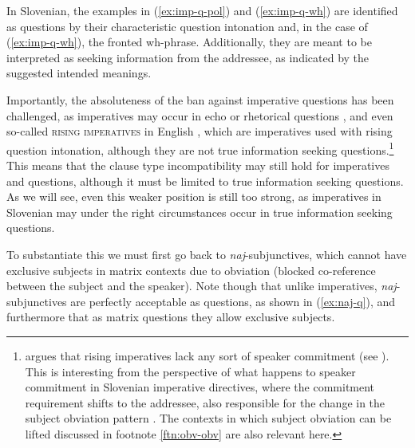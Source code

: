 \documentclass[output=paper,colorlinks,citecolor=brown]{langscibook}
\begin{document}
\ea\label{ex:imp-q}
\z\z

\noindent In Slovenian, the examples in (\ref{ex:imp-q-pol}) and (\ref{ex:imp-q-wh}) are identified as questions by their characteristic question intonation and, in the case of (\ref{ex:imp-q-wh}), the fronted wh-phrase. Additionally, they are meant to be interpreted as seeking information from the addressee, as indicated by the suggested intended meanings. 

 Importantly, the absoluteness of the ban against imperative questions has been challenged, as imperatives may occur in echo or rhetorical questions \citep[][]{kaufmann-poschmannLang}, and even so-called \textsc{rising imperatives} in English \citep[][]{rudin18}, which are imperatives used with rising question intonation, although they are not true information seeking questions.\footnote{\citet{rudin18} argues that rising imperatives lack any sort of speaker commitment (see ). This is interesting from the perspective of what happens to speaker commitment in Slovenian imperative directives, where the commitment requirement shifts to the addressee, also responsible for the change in the subject obviation pattern \citep{Stegovec2017,stegovec19}. The contexts in which subject obviation can be lifted discussed in footnote \ref{ftn:obv-obv} are also relevant here.} This means that the clause type incompatibility may still hold for imperatives and questions, although it must be limited to true information seeking questions. As we will see, even this weaker position is still too strong, as  imperatives in Slovenian may under the right circumstances occur in true information seeking questions.

To substantiate this we must first go back to \emph{naj}-subjunctives, which cannot have exclusive \fst{} subjects in matrix contexts due to obviation (blocked co-reference between the subject and the speaker). Note though that unlike imperatives, \emph{naj}-subjunctives are perfectly acceptable as questions, as shown in (\ref{ex:naj-q}), and furthermore that as matrix questions they allow exclusive \fst{} subjects. 
\end{document}
